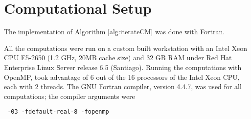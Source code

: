 \section{Computational Setup}

The implementation of Algorithm \ref{alg:iterateCM} was done with Fortran. 

All the computations were run on a custom built workstation with an Intel Xeon CPU E5-2650 (1.2 GHz, 20MB cache size) and 32 GB RAM under Red Hat Enterprise Linux Server release 6.5 (Santiago). 
Running the computations with OpenMP, took advantage of 6 out of the 16 processors of the Intel Xeon CPU, each with 2 threads.
The GNU Fortran compiler, version 4.4.7, was used for all computations; the compiler arguments were
\begin{verbatim} -03 -fdefault-real-8 -fopenmp \end{verbatim}



